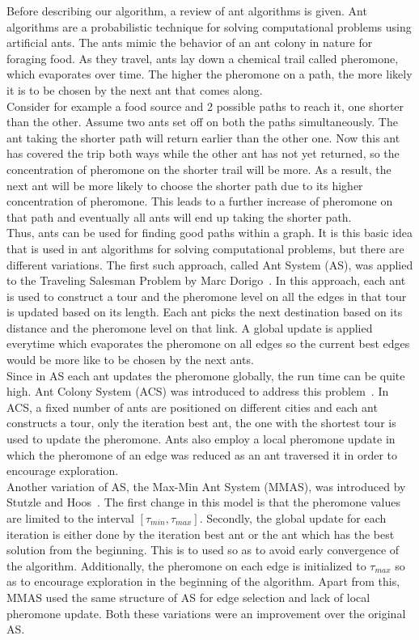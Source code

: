 \begin{spacing}{1.5}
Before describing our algorithm, a review of ant algorithms is given. Ant algorithms are a probabilistic technique for solving computational problems using artificial ants. The ants mimic the behavior of an ant colony in nature for foraging food. As they travel, ants lay down a chemical trail called pheromone, which evaporates over time. The higher the pheromone on a path, the more likely it is to be chosen by the next ant that comes along.\\
\indent Consider for example a food source and 2 possible paths to reach it, one shorter than the other. Assume two ants set off on both the paths simultaneously. The ant taking the shorter path will return earlier than the other one. Now this ant has covered the trip both ways while the other ant has not yet returned, so the concentration of pheromone on the shorter trail will be more. As a result, the next ant will be more likely to choose the shorter path due to its higher concentration of pheromone. This leads to a further increase of pheromone on that path and eventually all ants will end up taking the shorter path. \\
\indent Thus, ants can be used for finding good paths within a graph. It is this basic idea that is used in ant algorithms for solving computational problems, but there are different variations. The first such approach, called Ant System (AS), was applied to the Traveling Salesman Problem by Marc Dorigo~\cite{dorigo1992}. In this approach, each ant is used to construct a tour and the pheromone level on all the edges in that tour is updated based on its length. Each ant picks the next destination based on its distance and the pheromone level on that link. A global update is applied everytime which evaporates the pheromone on all edges so the current best edges would be more like to be chosen by the next ants.\\
\indent Since in AS each ant updates the pheromone globally, the run time can be quite high. Ant Colony System (ACS) was introduced to address this problem~\cite{585892}. In ACS, a fixed number of ants are positioned on different cities and each ant constructs a tour, only the iteration best ant, the one with the shortest tour is used to update the pheromone. Ants also employ a local pheromone update in which the pheromone of an edge was reduced as an ant traversed it in order to encourage exploration.\\
\indent Another variation of AS, the Max-Min Ant System (MMAS), was introduced by Stutzle and Hoos~\cite{Stützle2000889}. The first change in this model is that the pheromone values are limited to the interval $[\tau_{min}, \tau_{max}]$. Secondly, the global update for each iteration is either done by the iteration best ant or the ant which has the best solution from the beginning. This is to used so as to avoid early convergence of the algorithm. Additionally, the pheromone on each edge is initialized to $\tau_{max}$ so as to encourage exploration in the beginning of the algorithm. Apart from this, MMAS used the same structure of AS for edge selection and lack of local pheromone update. Both these variations were an improvement over the original AS.\\

\end{spacing}
